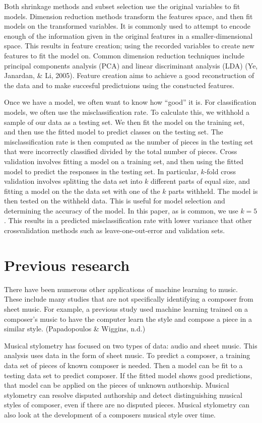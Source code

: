 \documentclass[12pt,twoside]{reedthesis}
\theoremstyle{definition}
\theoremstyle{definition}
\theoremstyle{definition}
\theoremstyle{remark}
\begin{document}
Both shrinkage methods and subset selection use the original variables
to fit models. Dimension reduction methods transform the features space,
and then fit models on the transformed variables. It is commonly used to
attempt to encode enough of the information given in the original
features in a smaller-dimensional space. This results in feature
creation; using the recorded variables to create new features to fit the
model on. Common dimension reduction techniques include principal
components analysis (PCA) and linear discriminant analysis (LDA) (Ye,
Janardan, \& Li, 2005). Feature creation aims to achieve a good
reconstruction of the data and to make succesful predictuions using the
constucted features.

Once we have a model, we often want to know how ``good'' it is. For
classification models, we often use the misclassification rate. To
calculate this, we withhold a sample of our data as a testing set. We
then fit the model on the training set, and then use the fitted model to
predict classes on the testing set. The misclassification rate is then
computed as the number of pieces in the testing set that were
incorrectly classified divided by the total number of pieces. Cross
validation involves fitting a model on a training set, and then using
the fitted model to predict the responses in the testing set. In
particular, \(k\)-fold cross validation involves splitting the data set
into \(k\) different parts of equal size, and fitting a model on the the
data set with one of the \(k\) parts withheld. The model is then tested
on the withheld data. This is useful for model selection and determining
the accuracy of the model. In this paper, as is common, we use
\(k = 5\). This results in a predicted misclassification rate with lower
variance that other crossvalidation methods such as leave-one-out-error
and validation sets.

\section{Previous research}\label{previous-research}

There have been numerous other applications of machine learning to
music. These include many studies that are not specifically identifying
a composer from sheet music. For example, a previous study used machine
learning trained on a composer's music to have the computer learn the
style and compose a piece in a similar style. (Papadopoulos \& Wiggins,
n.d.)

Musical stylometry has focused on two types of data: audio and sheet
music. This analysis uses data in the form of sheet music. To predict a
composer, a training data set of pieces of known composer is needed.
Then a model can be fit to a testing data set to predict composer. If
the fitted model shows good predictions, that model can be applied on
the pieces of unknown authorship. Musical stylometry can resolve
disputed authorship and detect distinguishing musical styles of
composer, even if there are no disputed pieces. Musical stylometry can
also look at the development of a composers musical style over time.
\end{document}
